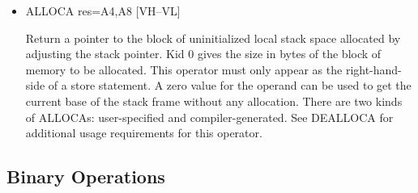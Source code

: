\begin{itemize}
\item
{}%
ALLOCA res=A4,A8 \hfill [VH--VL]

Return a pointer to the block of uninitialized local stack space
allocated by adjusting the stack pointer. Kid 0 gives the size in
bytes of the block of
memory to be allocated. This operator must only appear as the
right-hand-side of a store statement. A zero value for the operand
can be used to get the current base of the stack frame without any
allocation. There are two kinds of
%
ALLOCAs: user-specified and compiler-generated. See
%
DEALLOCA for
additional usage requirements for this operator.

\end{itemize}
\subsection{Binary Operations}
